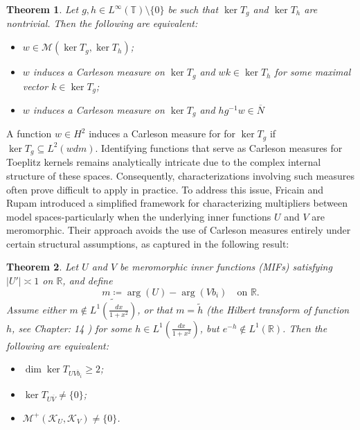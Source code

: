 \documentclass[12pt,a4paper]{amsart}
\newtheorem{theorem}{Theorem}[section]
\begin{document}
\smallskip



\begin{theorem}\emph{{\cite{camara2018multipliers}}}\label{th1}
Let \( g, h \in L^\infty(\mathbb{T}) \setminus \{0\} \) be such that \( \ker T_g \) and \( \ker T_h \) are nontrivial. Then the following are equivalent:
\begin{itemize}
    \item[(1)] \( w \in \mathcal{M}(\ker T_g, \ker T_h) \);
    \item[(2)] $w$ induces a Carleson measure on $\ker T_g$ and \( w k \in \ker T_h \) for some maximal vector \( k \in \ker T_g \);
    \item[(3)] $w$ induces a Carleson measure on $\ker T_g$ and \( h g^{-1} w \in \overline{N} \)
\end{itemize}

\end{theorem}

A function $w\in H^2$ induces a Carleson measure for for $\ker T_g$ if $\ker T_g\subseteq L^2(wdm)$. Identifying functions that serve as Carleson measures for Toeplitz kernels remains analytically intricate due to the complex internal structure of these spaces. Consequently, characterizations involving such measures often prove difficult to apply in practice. To address this issue, Fricain and Rupam \cite{FRR18} introduced a simplified framework for characterizing multipliers between model spaces-particularly when the underlying inner functions \( U \) and \( V \) are meromorphic. Their approach avoids the use of Carleson measures entirely under certain structural assumptions, as captured in the following result:

\begin{theorem}\emph{\cite{FRR18}}\label{th2}
Let \( U \) and \( V \) be meromorphic inner functions (MIFs) satisfying \( |U'| \asymp 1 \) on \( \mathbb{R} \), and define
\[
m \coloneqq \arg(U) - \arg(Vb_i) \quad \text{on } \mathbb{R}.
\]
Assume either \( m \not\in \widetilde{L^1\left(\frac{dx}{1+x^2}\right)} \), or that \( m = \tilde{h} \) (the Hilbert transform of function $h$,  see Chapter: 14 \cite{mashregibook}) for some \( h \in L^1\left(\frac{dx}{1+x^2}\right) \), but \( e^{-h} \not\in L^1(\mathbb{R}) \). Then the following are equivalent:
\begin{itemize}
    \item[(1)] \( \dim \ker T_{U\overline{Vb_i}} \geq 2 \);
    \item[(2)] \( \ker T_{U\overline{V}} \neq \{0\} \);
    \item[(3)] \( \mathcal{M}^+(\mathcal{K}_U, \mathcal{K}_V) \neq \{0\} \).
\end{itemize}
\end{theorem}
\end{document}
